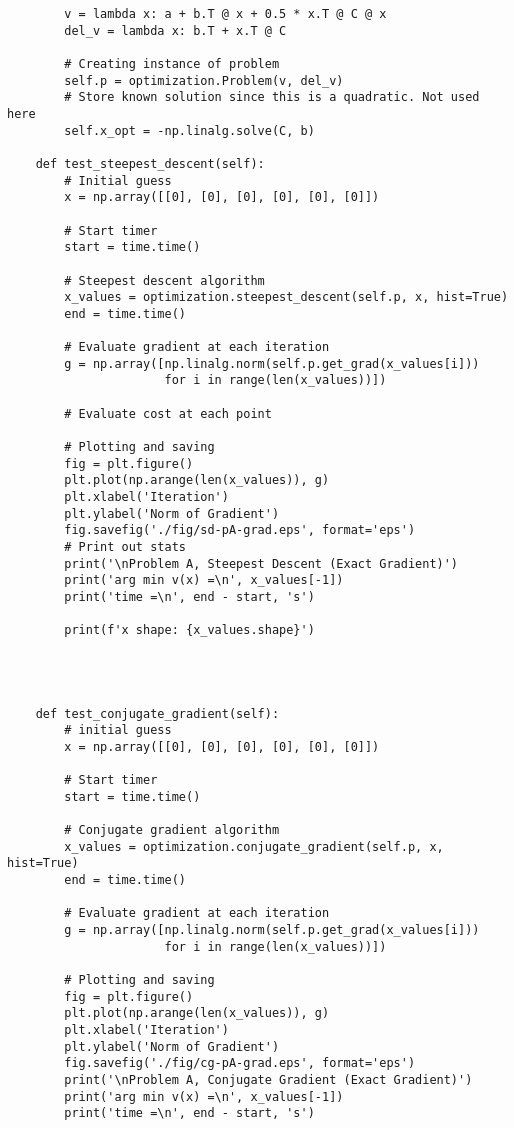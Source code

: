 \begin{lstlisting}
        v = lambda x: a + b.T @ x + 0.5 * x.T @ C @ x
        del_v = lambda x: b.T + x.T @ C

        # Creating instance of problem
        self.p = optimization.Problem(v, del_v)
        # Store known solution since this is a quadratic. Not used here
        self.x_opt = -np.linalg.solve(C, b)

    def test_steepest_descent(self):
        # Initial guess
        x = np.array([[0], [0], [0], [0], [0], [0]])

        # Start timer
        start = time.time()

        # Steepest descent algorithm
        x_values = optimization.steepest_descent(self.p, x, hist=True)
        end = time.time()

        # Evaluate gradient at each iteration
        g = np.array([np.linalg.norm(self.p.get_grad(x_values[i]))
                      for i in range(len(x_values))])

        # Evaluate cost at each point

        # Plotting and saving
        fig = plt.figure()
        plt.plot(np.arange(len(x_values)), g)
        plt.xlabel('Iteration')
        plt.ylabel('Norm of Gradient')
        fig.savefig('./fig/sd-pA-grad.eps', format='eps')
        # Print out stats
        print('\nProblem A, Steepest Descent (Exact Gradient)')
        print('arg min v(x) =\n', x_values[-1])
        print('time =\n', end - start, 's')

        print(f'x shape: {x_values.shape}')




    def test_conjugate_gradient(self):
        # initial guess
        x = np.array([[0], [0], [0], [0], [0], [0]])

        # Start timer
        start = time.time()

        # Conjugate gradient algorithm
        x_values = optimization.conjugate_gradient(self.p, x, hist=True)
        end = time.time()

        # Evaluate gradient at each iteration
        g = np.array([np.linalg.norm(self.p.get_grad(x_values[i]))
                      for i in range(len(x_values))])

        # Plotting and saving
        fig = plt.figure()
        plt.plot(np.arange(len(x_values)), g)
        plt.xlabel('Iteration')
        plt.ylabel('Norm of Gradient')
        fig.savefig('./fig/cg-pA-grad.eps', format='eps')
        print('\nProblem A, Conjugate Gradient (Exact Gradient)')
        print('arg min v(x) =\n', x_values[-1])
        print('time =\n', end - start, 's')


\end{lstlisting}
